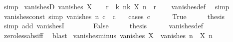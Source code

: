 \begin{isabellebody}
\ simp%
\endisatagproof
{\isafoldproof}%
%
\isadelimproof
\isanewline
%
\endisadelimproof
\isanewline
{}\isamarkupfalse%
\ vanishesD{\isacharcolon}{\kern0pt}\ {\isachardoublequoteopen}vanishes\ X\ {\isasymLongrightarrow}\ {}\ {\isacharless}{\kern0pt}\ r\ {\isasymLongrightarrow}\ {\isasymexists}k{\isachardot}{\kern0pt}\ {\isasymforall}n{\isasymge}k{\isachardot}{\kern0pt}\ {\isasymbar}X\ n{\isasymbar}\ {\isacharless}{\kern0pt}\ r{\isachardoublequoteclose}\isanewline
%
\isadelimproof
\ \ %
\endisadelimproof
%
\isatagproof
{}\isamarkupfalse%
\ vanishes{\isacharunderscore}{\kern0pt}def\ \isamarkupfalse%
\ simp%
\endisatagproof
{\isafoldproof}%
%
\isadelimproof
\isanewline
%
\endisadelimproof
\isanewline
{}\isamarkupfalse%
\ vanishes{\isacharunderscore}{\kern0pt}const\ {\isacharbrackleft}{\kern0pt}simp{\isacharbrackright}{\kern0pt}{\isacharcolon}{\kern0pt}\ {\isachardoublequoteopen}vanishes\ {\isacharparenleft}{\kern0pt}{\isasymlambda}n{\isachardot}{\kern0pt}\ c{\isacharparenright}{\kern0pt}\ {\isasymlongleftrightarrow}\ c\ {\isacharequal}{\kern0pt}\ {}{\isachardoublequoteclose}\isanewline
%
\isadelimproof
%
\endisadelimproof
%
\isatagproof
{}\isamarkupfalse%
\ {\isacharparenleft}{\kern0pt}cases\ {\isachardoublequoteopen}c\ {\isacharequal}{\kern0pt}\ {}{\isachardoublequoteclose}{\isacharparenright}{\kern0pt}\isanewline
\ \ \isamarkupfalse%
\ True\isanewline
\ \ \isamarkupfalse%
\ \isamarkupfalse%
\ {\isacharquery}{\kern0pt}thesis\isanewline
\ \ \ \ \isamarkupfalse%
\ {\isacharparenleft}{\kern0pt}simp\ add{\isacharcolon}{\kern0pt}\ vanishesI{\isacharparenright}{\kern0pt}\ \ \ \ \isanewline
{}\isamarkupfalse%
\isanewline
\ \ \isamarkupfalse%
\ False\isanewline
\ \ \isamarkupfalse%
\ \isamarkupfalse%
\ {\isacharquery}{\kern0pt}thesis\isanewline
\ \ \ \ \isamarkupfalse%
\ vanishes{\isacharunderscore}{\kern0pt}def\isanewline
\ \ \ \ \isamarkupfalse%
\ zero{\isacharunderscore}{\kern0pt}less{\isacharunderscore}{\kern0pt}abs{\isacharunderscore}{\kern0pt}iff\ \isamarkupfalse%
\ blast\isanewline
{}\isamarkupfalse%
%
\endisatagproof
{\isafoldproof}%
%
\isadelimproof
\isanewline
%
\endisadelimproof
\isanewline
{}\isamarkupfalse%
\ vanishes{\isacharunderscore}{\kern0pt}minus{\isacharcolon}{\kern0pt}\ {\isachardoublequoteopen}vanishes\ X\ {\isasymLongrightarrow}\ vanishes\ {\isacharparenleft}{\kern0pt}{\isasymlambda}n{\isachardot}{\kern0pt}\ {\isacharminus}{\kern0pt}\ X\ n{\isacharparenright}{\kern0pt}{\isachardoublequoteclose}\isanewline

\end{isabellebody}
